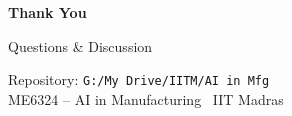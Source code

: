 ﻿\documentclass[11pt,aspectratio=169]{beamer}
\begin{document}
\begin{frame}
    \centering
    \vfill
    \Huge \textbf{Thank You}
    \vspace{1em}

    \Large Questions \& Discussion
    \vspace{2em}

    \large Repository: \texttt{G:/My Drive/IITM/AI in Mfg} \\
    ME6324 -- AI in Manufacturing \textbar\ IIT Madras
    \vfill
\end{frame}
\end{document}
